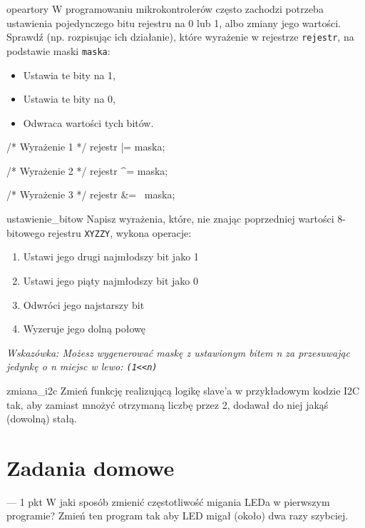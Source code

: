 \documentclass{pdfBooklets}
\begin{document}
\begin{Zadanie}{}{opeartory}
  W programowaniu mikrokontrolerów często zachodzi potrzeba ustawienia pojedynczego bitu rejestru na 0 lub 1, albo zmiany jego wartości.
  Sprawdź (np. rozpisując ich działanie), które wyrażenie w rejestrze \Verb$rejestr$, na podstawie maski \Verb$maska$:
  \begin{itemize}
  \item Ustawia te bity na 1,
  \item Ustawia te bity na 0,
  \item Odwraca wartości tych bitów.
  \end{itemize}

  \begin{CodeFrame*}[c]{}
    /* Wyrażenie 1 */
    rejestr |= maska;

    /* Wyrażenie 2 */
    rejestr ^= maska;

    /* Wyrażenie 3 */
    rejestr &= ~maska;
    \end{CodeFrame*}
\end{Zadanie}

\begin{Zadanie}{}{ustawienie_bitow}
  Napisz wyrażenia, które, nie znając poprzedniej wartości 8-bitowego rejestru \Verb$XYZZY$, wykona operacje:
  \begin{enumerate}
  \item Ustawi jego drugi najmłodszy bit jako 1
  \item Ustawi jego piąty najmłodszy bit jako 0
  \item Odwróci jego najstarszy bit
  \item Wyzeruje jego dolną połowę
  \end{enumerate}
  \textit{Wskazówka: Możesz wygenerować maskę z ustawionym bitem n za przesuwając jedynkę o n miejsc w lewo: \Verb$(1<<n)$}
\end{Zadanie}
\begin{Zadanie}{}{zmiana_i2c}
  Zmień funkcję realizującą logikę slave'a w przykładowym kodzie I2C tak, aby zamiast mnożyć otrzymaną liczbę przez 2, dodawał do niej jakąś
  (dowolną) stałą.
\end{Zadanie}

\section{Zadania domowe}

\begin{Zadanie}{ --- 1 pkt}
W jaki sposób zmienić częstotliwość migania LEDa w pierwszym programie? Zmień ten program tak aby LED migał (około) dwa razy szybciej.
\end{Zadanie}
\end{document}
